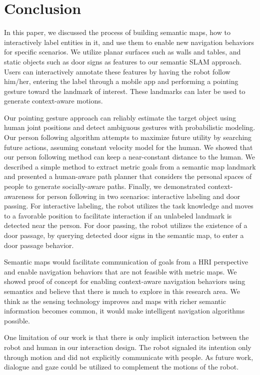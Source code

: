 \documentclass[3p]{elsarticle}
\begin{document}
\section{Conclusion}
\label{sec:conclusions}

In this paper, we discussed the process of building semantic maps, how to interactively label entities in it, and use them to enable new navigation behaviors for specific scenarios. We utilize planar surfaces such as walls and tables, and static objects such as door signs as features to our semantic SLAM approach. Users can interactively annotate these features by having the robot follow him/her, entering the label through a mobile app and performing a pointing gesture toward the landmark of interest. These landmarks can later be used to generate context-aware motions.

Our pointing gesture approach can reliably estimate the target object using human joint positions and detect ambiguous gestures with probabilistic modeling. Our person following algorithm attempts to maximize future utility by searching future actions, assuming constant velocity model for the human. We showed that our person following method can keep a near-constant distance to the human. We described a simple method to extract metric goals from a semantic map landmark and presented a human-aware path planner that considers the personal spaces of people to generate socially-aware paths. Finally, we demonstrated context-awareness for person following in two scenarios: interactive labeling and door passing. For interactive labeling, the robot utilizes the task knowledge and moves to a favorable position to facilitate interaction if an unlabeled landmark is detected near the person. For door passing, the robot utilizes the existence of a door passage, by querying detected door signs in the semantic map, to enter a door passage behavior.

Semantic maps would facilitate communication of goals from a HRI perspective and enable navigation behaviors that are not feasible with metric maps. We showed proof of concept for enabling context-aware navigation behaviors using semantics and believe that there is much to explore in this research area. We think as the sensing technology improves and maps with richer semantic information becomes common, it would make intelligent navigation algorithms possible.

One limitation of our work is that there is only implicit interaction between the robot and human in our interaction design. The robot signaled its intention only through motion and did not explicitly communicate with people. As future work, dialogue and gaze could be utilized to complement the motions of the robot. 
\end{document}
